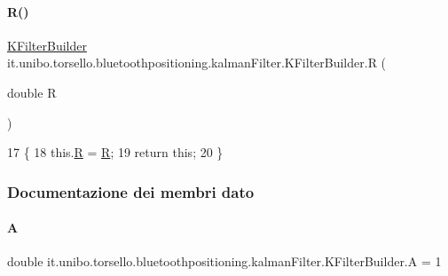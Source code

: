 \paragraph{\texorpdfstring{R()}{R()}}
{\footnotesize\ttfamily \hyperlink{classit_1_1unibo_1_1torsello_1_1bluetoothpositioning_1_1kalmanFilter_1_1KFilterBuilder}{K\+Filter\+Builder} it.\+unibo.\+torsello.\+bluetoothpositioning.\+kalman\+Filter.\+K\+Filter\+Builder.\+R (\begin{DoxyParamCaption}\item[{double}]{R }\end{DoxyParamCaption})}


\begin{DoxyCode}
17                                       \{
18         this.\hyperlink{classit_1_1unibo_1_1torsello_1_1bluetoothpositioning_1_1kalmanFilter_1_1KFilterBuilder_a22e1c6b090427b1f85c5bc635e78b232_a22e1c6b090427b1f85c5bc635e78b232}{R} = \hyperlink{classit_1_1unibo_1_1torsello_1_1bluetoothpositioning_1_1kalmanFilter_1_1KFilterBuilder_a22e1c6b090427b1f85c5bc635e78b232_a22e1c6b090427b1f85c5bc635e78b232}{R};
19         \textcolor{keywordflow}{return} \textcolor{keyword}{this};
20     \}
\end{DoxyCode}


\subsubsection{Documentazione dei membri dato}
\hypertarget{classit_1_1unibo_1_1torsello_1_1bluetoothpositioning_1_1kalmanFilter_1_1KFilterBuilder_aad2f769a976e0881bc28e382300f6ebd_aad2f769a976e0881bc28e382300f6ebd}{}\label{classit_1_1unibo_1_1torsello_1_1bluetoothpositioning_1_1kalmanFilter_1_1KFilterBuilder_aad2f769a976e0881bc28e382300f6ebd_aad2f769a976e0881bc28e382300f6ebd} 
\paragraph{\texorpdfstring{A}{A}}
{\footnotesize\ttfamily double it.\+unibo.\+torsello.\+bluetoothpositioning.\+kalman\+Filter.\+K\+Filter\+Builder.\+A = 1\hspace{0.3cm}{\ttfamily [private]}}

